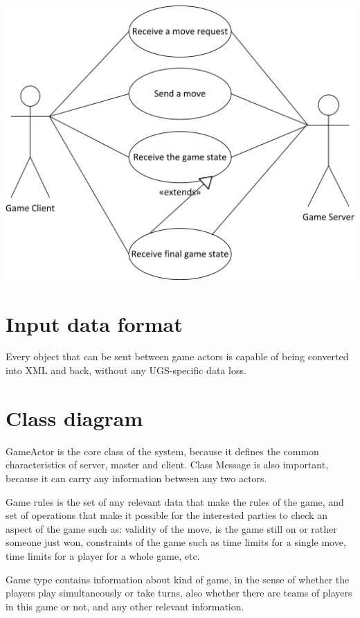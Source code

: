 \documentclass{article}
\begin{document}
\includegraphics[scale=1.20]{UGS_usecases_application-client,server.jpg}

\section{Input data format}
Every object that can be sent between game actors is capable of being converted into XML and back, 
without any UGS-specific data loss.


\pagebreak[4]


\section{Class diagram}
GameActor is the core class of the system, because it defines the common 
characteristics of server, master and client. Class Message is also important, because it can carry 
any information between any two actors.

Game rules is the set of any relevant data that make the rules of the game, and set of operations 
that make it possible for the interested parties to check an aspect of the game such as: validity 
of the move, is the game still on or rather someone just won, constraints of the game such as time limits
for a single move, time limits for a player for a whole game, etc.

Game type contains information about kind of game, in the sense of whether the players play simultaneously 
or take turns, also whether there are teams of players in this game or not, and any other relevant information.
\end{document}

